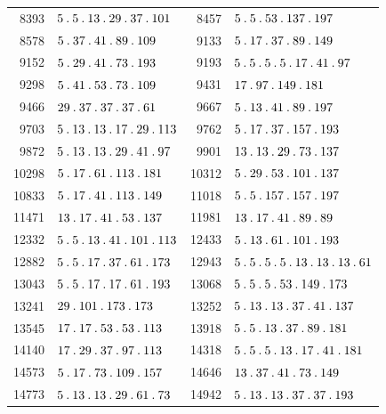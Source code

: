 %
\begingroup\small\setlength{\tabcolsep}{4pt}
\begin{longtable}{@{}r|l@{\qquad}r|l@{}}
8393 & $5\pdot 5\pdot 13\pdot 29\pdot 37\pdot 101$ & 8457 & $5\pdot 5\pdot 53\pdot 137\pdot 197$\\
8578 & $5\pdot 37\pdot 41\pdot 89\pdot 109$ & 9133 & $5\pdot 17\pdot 37\pdot 89\pdot 149$\\
9152 & $5\pdot 29\pdot 41\pdot 73\pdot 193$ & 9193 & $5\pdot 5\pdot 5\pdot 5\pdot 17\pdot 41\pdot 97$\\
9298 & $5\pdot 41\pdot 53\pdot 73\pdot 109$ & 9431 & $17\pdot 97\pdot 149\pdot 181$\\
9466 & $29\pdot 37\pdot 37\pdot 37\pdot 61$ & 9667 & $5\pdot 13\pdot 41\pdot 89\pdot 197$\\
9703 & $5\pdot 13\pdot 13\pdot 17\pdot 29\pdot 113$ & 9762 & $5\pdot 17\pdot 37\pdot 157\pdot 193$\\
9872 & $5\pdot 13\pdot 13\pdot 29\pdot 41\pdot 97$ & 9901 & $13\pdot 13\pdot 29\pdot 73\pdot 137$\\
10298 & $5\pdot 17\pdot 61\pdot 113\pdot 181$ & 10312 & $5\pdot 29\pdot 53\pdot 101\pdot 137$\\
10833 & $5\pdot 17\pdot 41\pdot 113\pdot 149$ & 11018 & $5\pdot 5\pdot 157\pdot 157\pdot 197$\\
11471 & $13\pdot 17\pdot 41\pdot 53\pdot 137$ & 11981 & $13\pdot 17\pdot 41\pdot 89\pdot 89$\\
12332 & $5\pdot 5\pdot 13\pdot 41\pdot 101\pdot 113$ & 12433 & $5\pdot 13\pdot 61\pdot 101\pdot 193$\\
12882 & $5\pdot 5\pdot 17\pdot 37\pdot 61\pdot 173$ & 12943 & $5\pdot 5\pdot 5\pdot 5\pdot 13\pdot 13\pdot 13\pdot 61$\\
13043 & $5\pdot 5\pdot 17\pdot 17\pdot 61\pdot 193$ & 13068 & $5\pdot 5\pdot 5\pdot 53\pdot 149\pdot 173$\\
13241 & $29\pdot 101\pdot 173\pdot 173$ & 13252 & $5\pdot 13\pdot 13\pdot 37\pdot 41\pdot 137$\\
13545 & $17\pdot 17\pdot 53\pdot 53\pdot 113$ & 13918 & $5\pdot 5\pdot 13\pdot 37\pdot 89\pdot 181$\\
14140 & $17\pdot 29\pdot 37\pdot 97\pdot 113$ & 14318 & $5\pdot 5\pdot 5\pdot 13\pdot 17\pdot 41\pdot 181$\\
14573 & $5\pdot 17\pdot 73\pdot 109\pdot 157$ & 14646 & $13\pdot 37\pdot 41\pdot 73\pdot 149$\\
14773 & $5\pdot 13\pdot 13\pdot 29\pdot 61\pdot 73$ & 14942 & $5\pdot 13\pdot 13\pdot 37\pdot 37\pdot 193$\\

\end{longtable}
